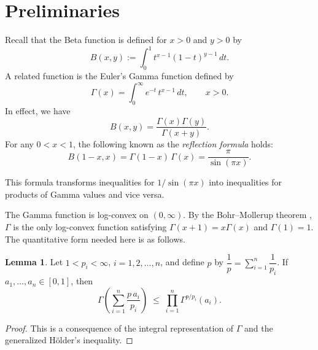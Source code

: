 \documentclass[12pt]{amsart}
\theoremstyle{definition}
\newtheorem{lemma}{Lemma}[section]
\begin{document}
\section{Preliminaries}\label{sec:prelim}

Recall that the Beta function is defined for $x>0$ and $y>0$ by
\[
  B(x,y):=\int_0^1 t^{x-1}(1-t)^{y-1}\,dt.
\]
A related function is the Euler's Gamma function defined by
\[
  \Gamma(x)=\int_0^\infty e^{-t}\,t^{x-1}\,dt,\qquad x>0.
\]
In effect, we have  $$B(x,y)=\frac{\Gamma(x)\Gamma(y)}{\Gamma(x+y)}.$$  For any $0<x<1$,
the following known as the \emph{reflection formula} holds:
\begin{equation}\label{eq:reflection}
  B(1-x,x)=\Gamma(1-x)\,\Gamma(x)=\frac{\pi}{\sin(\pi x)}.
\end{equation}

This formula transforms inequalities for $1/\sin(\pi x)$ into inequalities
for products of Gamma values and vice versa.

The Gamma function is log-convex on $(0,\infty)$.  By the
Bohr--Mollerup theorem \cite{BohrMollerup1922}, $\Gamma$ is the
only log-convex function satisfying $\Gamma(x+1)=x\Gamma(x)$
and $\Gamma(1)=1$.  The quantitative form needed here is as follows.

\begin{lemma}\label{lem:logconvex}
Let $1<p_i<\infty$, $i=1,2,\ldots,n$, and define $p$ by
$\dfrac{1}{p}=\displaystyle\sum_{i=1}^{n}\dfrac{1}{p_i}$.
If $a_1,\ldots,a_n\in[0,1]$, then
\begin{equation}\label{eq:logconvex}
  \Gamma\!\left(\sum_{i=1}^n\frac{p\,a_i}{p_i}\right)
  \;\leq\;
  \prod_{i=1}^n\Gamma^{p/p_i}(a_i).
\end{equation}
\end{lemma}

\begin{proof}
This is a consequence of the integral representation of $\Gamma$
and the generalized H\"older's inequality.
\end{proof}

\end{document}
